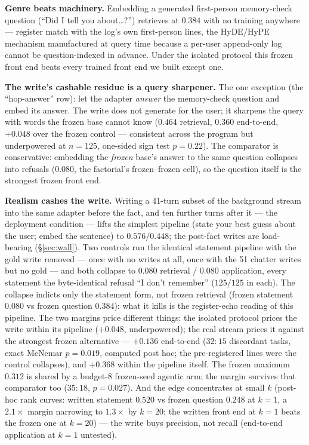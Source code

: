 \documentclass{article}
\begin{document}
\textbf{Genre beats machinery.} Embedding a generated first-person memory-check question
(``Did I tell you about\ldots?'') retrieves at $0.384$ with no training anywhere ---
register match with the log's own first-person lines, the HyDE/HyPE mechanism
\citep{gao2023hyde,vake2026hype} manufactured at query time because a per-user append-only
log cannot be question-indexed in advance. Under the isolated protocol this frozen front
end beats every trained front end we built except one.

\textbf{The write's cashable residue is a query sharpener.} The one exception (the
``hop-answer'' row): let the adapter \emph{answer} the memory-check question and embed its
answer. The write does not generate for the user; it sharpens the query with words the
frozen base cannot know ($0.464$ retrieval, $0.360$ end-to-end, $+0.048$ over the frozen
control --- consistent across the program but underpowered at $n{=}125$, one-sided sign
test $p{=}0.22$). The comparator is conservative: embedding the \emph{frozen} base's
answer to the same question collapses into refusals ($0.080$, the factorial's
frozen--frozen cell), so the question itself is the strongest frozen front end.

\textbf{Realism cashes the write.} Writing a 41-turn subset of the background stream
into the same adapter before the fact, and ten further turns after it --- the deployment
condition --- lifts the simplest pipeline (state your best guess about the user; embed
the sentence) to $0.576/0.448$; the post-fact writes are load-bearing
(\S\ref{sec:wall}). Two controls run the identical statement pipeline with the gold
write removed --- once with no writes at all, once with the 51 chatter writes but no
gold --- and both collapse to $0.080$ retrieval / $0.080$ application, every statement
the byte-identical refusal ``I don't remember'' ($125/125$ in each). The collapse
indicts only the statement form, not frozen retrieval (frozen statement $0.080$ vs
frozen question $0.384$): what it kills is the register-echo reading of this pipeline.
The two margins price different things: the isolated protocol prices the write within
its pipeline ($+0.048$, underpowered); the real stream prices it against the strongest
frozen alternative --- $+0.136$ end-to-end ($32{:}15$ discordant tasks, exact McNemar
$p{=}0.019$, computed post hoc; the pre-registered lines were the control collapses),
and $+0.368$ within the pipeline itself. The frozen maximum $0.312$ is shared by a
budget-8 frozen-seed agentic arm; the margin survives that comparator too ($35{:}18$,
$p{=}0.027$). And the edge concentrates at small $k$ (post-hoc rank curves: written
statement $0.520$ vs frozen question $0.248$ at $k{=}1$, a $2.1\times$ margin narrowing
to $1.3\times$ by $k{=}20$; the written front end at $k{=}1$ beats the frozen one at
$k{=}20$) --- the write buys precision, not recall (end-to-end application at $k{=}1$
untested).
\end{document}
